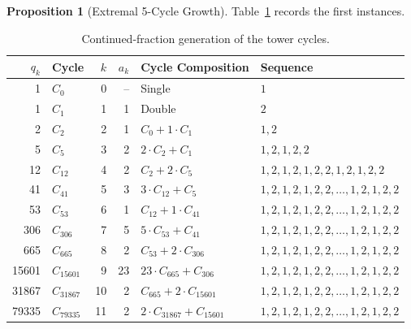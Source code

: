 \documentclass[12pt, oneside]{article}
\numberwithin{equation}{section}
\theoremstyle{definition}
\newtheorem{proposition}{Proposition}[section]
\theoremstyle{plain}
\theoremstyle{remark}
\begin{document}
\begin{proposition}[Extremal 5-Cycle Growth]
Table~\ref{tab:tower-cycles} records the first instances.

\begin{table}[ht]
\centering
\caption{Continued-fraction generation of the tower cycles.}
\label{tab:tower-cycles}
\begin{tabular}{r l r r l l}
\hline
$q_k$ & Cycle & $k$ & $a_k$ & Cycle Composition & Sequence \\
\hline
1     & $C_{    0}$ &  0 & -- & Single                          & $1$ \\
1     & $C_{    1}$ &  1 &  1 & Double                          & $2$ \\
2     & $C_{    2}$ &  2 &  1 & $C_{    0} + 1 \cdot C_{    1}$ & $1,2$ \\
5     & $C_{    5}$ &  3 &  2 & $2 \cdot C_{    2} + C_{    1}$ & $1,2,1,2,2$ \\
12    & $C_{   12}$ &  4 &  2 & $C_{    2} + 2 \cdot C_{    5}$ & $1,2,1,2,1,2,2,1,2,1,2,2$ \\
41    & $C_{   41}$ &  5 &  3 & $3 \cdot C_{   12} + C_{    5}$ & $1,2,1,2,1,2,2,\ldots,1,2,1,2,2$  \\
53    & $C_{   53}$ &  6 &  1 & $C_{   12} + 1 \cdot C_{   41}$ & $1,2,1,2,1,2,2,\ldots,1,2,1,2,2$  \\
306   & $C_{  306}$ &  7 &  5 & $5 \cdot C_{   53} + C_{   41}$ & $1,2,1,2,1,2,2,\ldots,1,2,1,2,2$  \\
665   & $C_{  665}$ &  8 &  2 & $C_{   53} + 2 \cdot C_{  306}$ & $1,2,1,2,1,2,2,\ldots,1,2,1,2,2$  \\
15601 & $C_{15601}$ &  9 & 23 & $23 \cdot C_{665} + C_{   306}$ & $1,2,1,2,1,2,2,\ldots,1,2,1,2,2$  \\
31867 & $C_{31867}$ & 10 &  2 & $C_{  665} + 2 \cdot C_{15601}$ & $1,2,1,2,1,2,2,\ldots,1,2,1,2,2$  \\
79335 & $C_{79335}$ & 11 &  2 & $2 \cdot C_{31867} + C_{15601}$ & $1,2,1,2,1,2,2,\ldots,1,2,1,2,2$  \\
\hline
\end{tabular}
\end{table}




\end{proposition}
\end{document}
